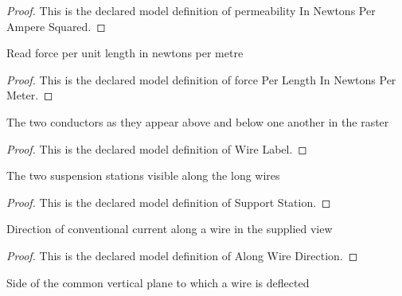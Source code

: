 \begin{proof}
  This is the declared model definition of permeability In Newtons Per Ampere Squared.
\end{proof}
\begin{definition}
  \label{def:physics:phyx-mini-0965:phyxminiproblems-problemphyxmini0965-forceperlengthinnewtonspermeter}
  Read force per unit length in newtons per metre
\end{definition}
\begin{proof}
  This is the declared model definition of force Per Length In Newtons Per Meter.
\end{proof}
\begin{definition}
  \label{def:physics:phyx-mini-0965:phyxminiproblems-problemphyxmini0965-wirelabel}
  The two conductors as they appear above and below one another in the raster
\end{definition}
\begin{proof}
  This is the declared model definition of Wire Label.
\end{proof}
\begin{definition}
  \label{def:physics:phyx-mini-0965:phyxminiproblems-problemphyxmini0965-supportstation}
  The two suspension stations visible along the long wires
\end{definition}
\begin{proof}
  This is the declared model definition of Support Station.
\end{proof}
\begin{definition}
  \label{def:physics:phyx-mini-0965:phyxminiproblems-problemphyxmini0965-alongwiredirection}
  Direction of conventional current along a wire in the supplied view
\end{definition}
\begin{proof}
  This is the declared model definition of Along Wire Direction.
\end{proof}
\begin{definition}
  \label{def:physics:phyx-mini-0965:phyxminiproblems-problemphyxmini0965-deflectionside}
  Side of the common vertical plane to which a wire is deflected
\end{definition}
